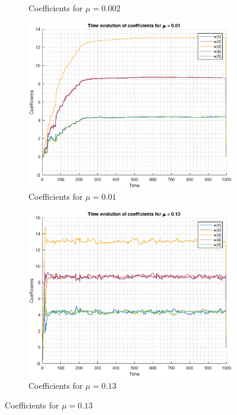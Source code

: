 \documentclass{article}
\begin{document}
\begin{figure}[h!]
\begin{subfigure}{0.32\textwidth}
\caption{Coefficients for $\mu=0.002$}
\label{fig:time_evol_g002}
\end{subfigure}
\begin{subfigure}{0.32\textwidth}
\centering
\includegraphics[width = \textwidth]{time_evol_g01}
\caption{Coefficients for $\mu=0.01$}
\label{fig:time_evol_g01}
\end{subfigure}
\begin{subfigure}{0.32\textwidth}
\centering
\includegraphics[width = \textwidth]{time_evol_g13}
\caption{Coefficients for $\mu=0.13$}
\label{fig:time_evol_g13}
\end{subfigure}

\end{figure}
\end{document}
